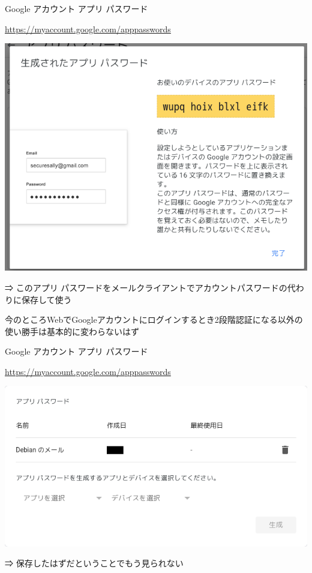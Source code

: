 \begin{frame}{Google アカウント アプリ パスワード}

{\footnotesize\url{https://myaccount.google.com/apppasswords}}

\begin{center}
\includegraphics[width=0.65\hsize]{image202205/g-apppass-1.png}
\end{center}

⇒ このアプリ パスワードをメールクライアントでアカウントパスワードの代わりに保存して使う

今のところWebでGoogleアカウントにログインするとき2段階認証になる以外の使い勝手は基本的に変わらないはず

\end{frame}

\begin{frame}{Google アカウント アプリ パスワード}

{\footnotesize\url{https://myaccount.google.com/apppasswords}}

\begin{center}
\includegraphics[width=0.8\hsize]{image202205/g-apppass-2.png}
\end{center}

⇒ 保存したはずだということでもう見られない

\end{frame}

